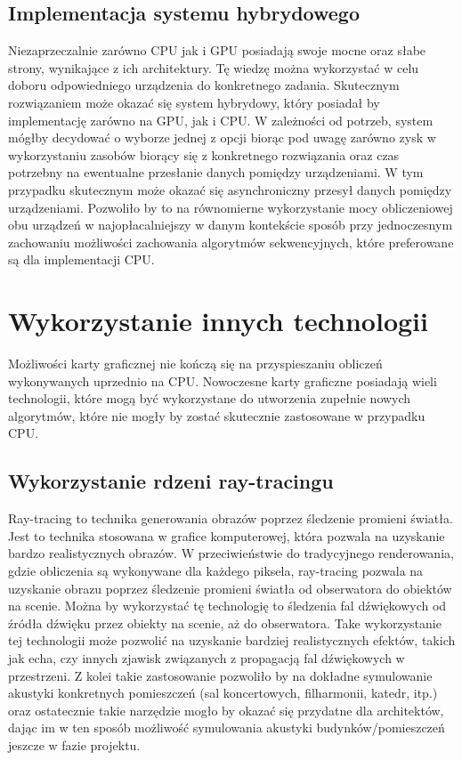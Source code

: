 \subsection{Implementacja systemu hybrydowego}
Niezaprzeczalnie zarówno CPU jak i GPU posiadają swoje mocne oraz słabe strony, wynikające z ich architektury. Tę wiedzę można wykorzystać w celu doboru odpowiedniego urządzenia do konkretnego zadania. Skutecznym rozwiązaniem może okazać się system hybrydowy, który posiadał by implementację zarówno na GPU, jak i CPU. W zależności od potrzeb, system mógłby decydować o wyborze jednej z opcji biorąc pod uwagę zarówno zysk w wykorzystaniu zasobów biorący się z konkretnego rozwiązania oraz czas potrzebny na ewentualne przesłanie danych pomiędzy urządzeniami. W tym przypadku skutecznym może okazać się asynchroniczny przesył danych pomiędzy urządzeniami. Pozwoliło by to na równomierne wykorzystanie mocy obliczeniowej obu urządzeń w najopłacalniejszy w danym kontekście sposób przy jednoczesnym zachowaniu możliwości zachowania algorytmów sekwencyjnych, które preferowane są dla implementacji CPU.

\section{Wykorzystanie innych technologii}
Możliwości karty graficznej nie kończą się na przyspieszaniu obliczeń wykonywanych uprzednio na CPU. Nowoczesne karty graficzne posiadają wieli technologii, które mogą być wykorzystane do utworzenia zupełnie nowych algorytmów, które nie mogły by zostać skutecznie zastosowane w przypadku CPU.

\subsection{Wykorzystanie rdzeni ray-tracingu}
Ray-tracing to technika generowania obrazów poprzez śledzenie promieni światła. Jest to technika stosowana w grafice komputerowej, która pozwala na uzyskanie bardzo realistycznych obrazów. W przeciwieństwie do tradycyjnego renderowania, gdzie obliczenia są wykonywane dla każdego piksela, ray-tracing pozwala na uzyskanie obrazu poprzez śledzenie promieni światła od obserwatora do obiektów na scenie. Można by wykorzystać tę technologię to śledzenia fal dźwiękowych od źródła dźwięku przez obiekty na scenie, aż do obserwatora. Take wykorzystanie tej technologii może pozwolić na uzyskanie bardziej realistycznych efektów, takich jak echa, czy innych zjawisk związanych z propagacją fal dźwiękowych w przestrzeni. Z kolei takie zastosowanie pozwoliło by na dokładne symulowanie akustyki konkretnych pomieszczeń (sal koncertowych, filharmonii, katedr, itp.) oraz ostatecznie takie narzędzie mogło by okazać się przydatne dla architektów, dając im w ten sposób możliwość symulowania akustyki budynków/pomieszczeń jeszcze w fazie projektu.

